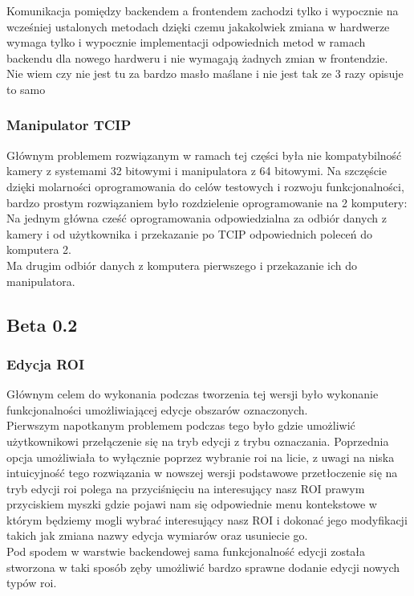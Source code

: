 \documentclass[11pt,a4paper]{article}
\begin{document}
    \hspace{1cm}Komunikacja pomiędzy backendem a frontendem zachodzi tylko i wypocznie na wcześniej ustalonych metodach dzięki czemu jakakolwiek zmiana w hardwerze wymaga tylko i wypocznie implementacji odpowiednich metod w ramach backendu dla nowego hardweru i nie wymagają żadnych zmian w frontendzie.\\


    {\color{red}
    Nie wiem czy nie jest tu za bardzo masło maślane i nie jest tak ze 3 razy opisuje to samo}

    \subsubsection{Manipulator TCIP}

    \hspace{1cm}Głównym problemem rozwiązanym w ramach tej części była nie kompatybilność kamery z systemami 32 bitowymi i manipulatora z 64 bitowymi. Na szczęście dzięki molarności oprogramowania do celów testowych i rozwoju funkcjonalności, bardzo prostym rozwiązaniem było rozdzielenie oprogramowanie na 2 komputery:\\
    \hspace{1cm}Na jednym główna cześć oprogramowania odpowiedzialna za odbiór danych z kamery i od użytkownika i przekazanie po TCIP odpowiednich poleceń do komputera 2.\\
    \hspace{1cm}Ma drugim odbiór danych z komputera pierwszego i przekazanie ich do manipulatora.

    \subsection{Beta 0.2}

    \subsubsection{Edycja ROI}
    \hspace{1cm} Głównym celem do wykonania podczas tworzenia tej wersji było wykonanie funkcjonalności umożliwiającej edycje obszarów oznaczonych. \\
    \hspace{1cm} Pierwszym napotkanym problemem podczas tego było gdzie umożliwić użytkownikowi przełączenie się na tryb edycji z trybu oznaczania. Poprzednia opcja umożliwiała to wyłącznie poprzez wybranie roi na licie, z uwagi na niska intuicyjność tego rozwiązania w nowszej wersji podstawowe przetłoczenie się na tryb edycji roi polega na przyciśnięciu na interesujący nasz ROI prawym przyciskiem myszki gdzie pojawi nam się odpowiednie menu kontekstowe w którym będziemy mogli wybrać interesujący nasz ROI i dokonać jego modyfikacji takich jak zmiana nazwy edycja wymiarów oraz usuniecie go. \\
    \hspace{1cm} Pod spodem w warstwie backendowej sama funkcjonalność edycji została stworzona w taki sposób zęby umożliwić bardzo sprawne dodanie edycji nowych typów roi.\\
\end{document}

